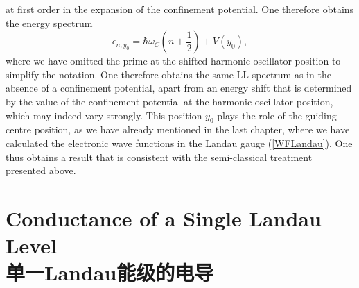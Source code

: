 \documentclass[10pt]{book}
\newcommand{\beq}{\begin{equation}}
\newcommand{\eeq}{\end{equation}}
\begin{document}
at first order in the expansion of the confinement potential. One therefore obtains the energy spectrum 
\beq\label{energyConf}
\epsilon_{n,y_0}=\hbar\omega_C\left(n + \frac{1}{2}\right) + V(y_0),
\eeq
where we have omitted the prime at the shifted harmonic-oscillator position to simplify the notation. One therefore
obtains the same LL spectrum as in the absence of a confinement potential, apart from an energy shift that is 
determined by the value of the confinement potential at the harmonic-oscillator position, which may indeed vary
strongly. This position $y_0$ plays the role of the guiding-centre position, as we have already mentioned in the last chapter,
where we have calculated the electronic wave functions in the Landau gauge (\ref{WFLandau}). One thus obtains
a result that is consistent with the semi-classical treatment presented above.



\section[单一Landau能级的电导]{Conductance of a Single Landau Level\\\bf 单一Landau能级的电导}
\label{LLCond}


\end{document}
